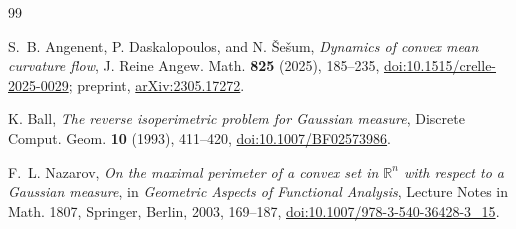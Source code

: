 \documentclass[11pt,reqno]{amsart}
\theoremstyle{remark}
\newcommand{\R}{\mathbb{R}}
\begin{document}
\begin{thebibliography}{99}

S.~B. Angenent, P. Daskalopoulos, and N. \v{S}e\v{s}um,
\emph{Dynamics of convex mean curvature flow},
J. Reine Angew. Math. \textbf{825} (2025), 185--235,
\href{https://doi.org/10.1515/crelle-2025-0029}
{doi:10.1515/crelle-2025-0029};
preprint, \href{https://arxiv.org/abs/2305.17272}{arXiv:2305.17272}.

K. Ball,
\emph{The reverse isoperimetric problem for Gaussian measure},
Discrete Comput. Geom. \textbf{10} (1993), 411--420,
\href{https://doi.org/10.1007/BF02573986}
{doi:10.1007/BF02573986}.

F.~L. Nazarov,
\emph{On the maximal perimeter of a convex set in \(\R^n\) with respect to
a Gaussian measure},
in \emph{Geometric Aspects of Functional Analysis},
Lecture Notes in Math. 1807, Springer, Berlin, 2003, 169--187,
\href{https://doi.org/10.1007/978-3-540-36428-3_15}
{doi:10.1007/978-3-540-36428-3\_15}.

\end{thebibliography}
\end{document}
